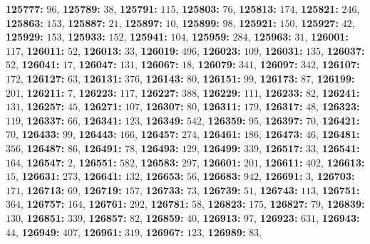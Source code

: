 \textsf{\bfseries 125777:} $96$, \textsf{\bfseries 125789:} $38$, \textsf{\bfseries 125791:} $115$, \textsf{\bfseries 125803:} $76$, \textsf{\bfseries 125813:} $174$, \textsf{\bfseries 125821:} $246$, \textsf{\bfseries 125863:} $153$, \textsf{\bfseries 125887:} $21$, \textsf{\bfseries 125897:} $10$, \textsf{\bfseries 125899:} $98$, \textsf{\bfseries 125921:} $150$, \textsf{\bfseries 125927:} $42$, \textsf{\bfseries 125929:} $153$, \textsf{\bfseries 125933:} $152$, \textsf{\bfseries 125941:} $104$, \textsf{\bfseries 125959:} $284$, \textsf{\bfseries 125963:} $31$, \textsf{\bfseries 126001:} $117$, \textsf{\bfseries 126011:} $52$, \textsf{\bfseries 126013:} $33$, \textsf{\bfseries 126019:} $496$, \textsf{\bfseries 126023:} $109$, \textsf{\bfseries 126031:} $135$, \textsf{\bfseries 126037:} $52$, \textsf{\bfseries 126041:} $17$, \textsf{\bfseries 126047:} $131$, \textsf{\bfseries 126067:} $18$, \textsf{\bfseries 126079:} $341$, \textsf{\bfseries 126097:} $342$, \textsf{\bfseries 126107:} $172$, \textsf{\bfseries 126127:} $63$, \textsf{\bfseries 126131:} $376$, \textsf{\bfseries 126143:} $80$, \textsf{\bfseries 126151:} $99$, \textsf{\bfseries 126173:} $87$, \textsf{\bfseries 126199:} $201$, \textsf{\bfseries 126211:} $7$, \textsf{\bfseries 126223:} $117$, \textsf{\bfseries 126227:} $388$, \textsf{\bfseries 126229:} $111$, \textsf{\bfseries 126233:} $82$, \textsf{\bfseries 126241:} $131$, \textsf{\bfseries 126257:} $45$, \textsf{\bfseries 126271:} $107$, \textsf{\bfseries 126307:} $80$, \textsf{\bfseries 126311:} $179$, \textsf{\bfseries 126317:} $48$, \textsf{\bfseries 126323:} $119$, \textsf{\bfseries 126337:} $66$, \textsf{\bfseries 126341:} $123$, \textsf{\bfseries 126349:} $542$, \textsf{\bfseries 126359:} $95$, \textsf{\bfseries 126397:} $70$, \textsf{\bfseries 126421:} $70$, \textsf{\bfseries 126433:} $99$, \textsf{\bfseries 126443:} $166$, \textsf{\bfseries 126457:} $274$, \textsf{\bfseries 126461:} $186$, \textsf{\bfseries 126473:} $46$, \textsf{\bfseries 126481:} $356$, \textsf{\bfseries 126487:} $86$, \textsf{\bfseries 126491:} $78$, \textsf{\bfseries 126493:} $129$, \textsf{\bfseries 126499:} $339$, \textsf{\bfseries 126517:} $33$, \textsf{\bfseries 126541:} $164$, \textsf{\bfseries 126547:} $2$, \textsf{\bfseries 126551:} $582$, \textsf{\bfseries 126583:} $297$, \textsf{\bfseries 126601:} $201$, \textsf{\bfseries 126611:} $402$, \textsf{\bfseries 126613:} $15$, \textsf{\bfseries 126631:} $273$, \textsf{\bfseries 126641:} $132$, \textsf{\bfseries 126653:} $56$, \textsf{\bfseries 126683:} $942$, \textsf{\bfseries 126691:} $3$, \textsf{\bfseries 126703:} $171$, \textsf{\bfseries 126713:} $69$, \textsf{\bfseries 126719:} $157$, \textsf{\bfseries 126733:} $73$, \textsf{\bfseries 126739:} $51$, \textsf{\bfseries 126743:} $113$, \textsf{\bfseries 126751:} $364$, \textsf{\bfseries 126757:} $164$, \textsf{\bfseries 126761:} $292$, \textsf{\bfseries 126781:} $58$, \textsf{\bfseries 126823:} $175$, \textsf{\bfseries 126827:} $79$, \textsf{\bfseries 126839:} $130$, \textsf{\bfseries 126851:} $339$, \textsf{\bfseries 126857:} $82$, \textsf{\bfseries 126859:} $40$, \textsf{\bfseries 126913:} $97$, \textsf{\bfseries 126923:} $631$, \textsf{\bfseries 126943:} $44$, \textsf{\bfseries 126949:} $407$, \textsf{\bfseries 126961:} $319$, \textsf{\bfseries 126967:} $123$, \textsf{\bfseries 126989:} $83$, 

